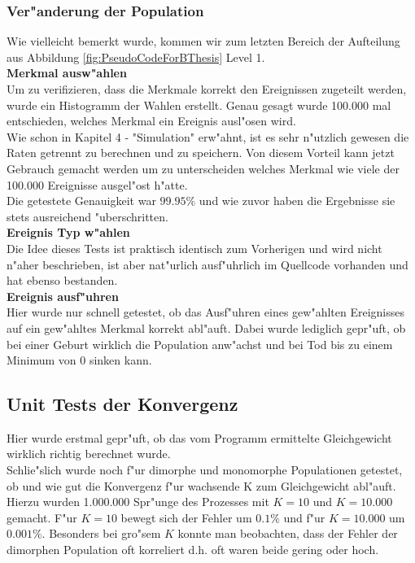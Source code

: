 \documentclass[11pt, a4paper, german]{article}
\theoremstyle{plain}
\begin{document}
	\subsubsection{Ver"anderung der Population}
	Wie vielleicht bemerkt wurde, kommen wir zum letzten Bereich der Aufteilung aus Abbildung \ref{fig:PseudoCodeForBThesis} Level 1.\\
	
	\textbf{Merkmal ausw"ahlen}\\
	Um zu verifizieren, dass die Merkmale korrekt den Ereignissen zugeteilt werden, wurde ein Histogramm der Wahlen erstellt. Genau gesagt wurde 100.000 mal entschieden, welches Merkmal ein Ereignis ausl"osen wird.\\
	Wie schon in Kapitel 4 - "{}Simulation"{} erw"ahnt, ist es sehr n"utzlich gewesen die Raten getrennt zu berechnen und zu speichern. Von diesem Vorteil kann jetzt Gebrauch gemacht werden um zu unterscheiden welches Merkmal wie viele der 100.000 Ereignisse ausgel"ost h"atte.\\
	Die getestete Genauigkeit war $ 99.95\% $ und wie zuvor haben die Ergebnisse sie stets ausreichend "uberschritten.\\
	
	\textbf{Ereignis Typ w"ahlen}\\
	Die Idee dieses Tests ist praktisch identisch zum Vorherigen und wird nicht n"aher beschrieben, ist aber nat"urlich ausf"uhrlich im Quellcode vorhanden und hat ebenso bestanden.\\
	
	\textbf{Ereignis ausf"uhren}\\
	Hier wurde nur schnell getestet, ob das Ausf"uhren eines gew"ahlten Ereignisses auf ein gew"ahltes Merkmal korrekt abl"auft. Dabei wurde lediglich gepr"uft, ob bei einer Geburt wirklich die Population anw"achst und bei Tod bis zu einem Minimum von 0 sinken kann.
	
	\subsection{Unit Tests der Konvergenz}
	Hier wurde erstmal gepr"uft, ob das vom Programm ermittelte Gleichgewicht wirklich richtig berechnet wurde.\\
	Schlie"slich wurde noch f"ur dimorphe und monomorphe Populationen getestet, ob und wie gut die Konvergenz f"ur wachsende K zum Gleichgewicht abl"auft. Hierzu wurden 1.000.000 Spr"unge des Prozesses mit $ K = 10 $ und $ K = 10.000 $ gemacht. F"ur $ K = 10 $ bewegt sich der Fehler um $ 0.1\% $ und f"ur $ K = 10.000 $ um $ 0.001\% $. Besonders bei gro"sem $ K $ konnte man beobachten, dass der Fehler der dimorphen Population oft korreliert d.h. oft waren beide gering oder hoch.
	
\end{document}
